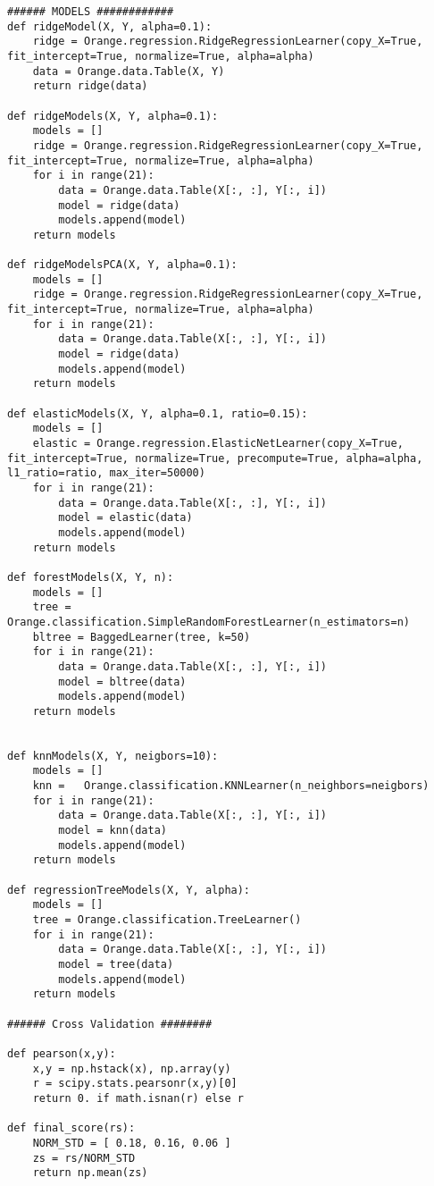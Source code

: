 \documentclass[a4paper,11pt]{article}
\begin{document}
\begin{lstlisting}
###### MODELS ############
def ridgeModel(X, Y, alpha=0.1):
    ridge = Orange.regression.RidgeRegressionLearner(copy_X=True, fit_intercept=True, normalize=True, alpha=alpha)
    data = Orange.data.Table(X, Y)
    return ridge(data)

def ridgeModels(X, Y, alpha=0.1):
    models = []
    ridge = Orange.regression.RidgeRegressionLearner(copy_X=True, fit_intercept=True, normalize=True, alpha=alpha)
    for i in range(21):
        data = Orange.data.Table(X[:, :], Y[:, i])
        model = ridge(data)
        models.append(model)
    return models

def ridgeModelsPCA(X, Y, alpha=0.1):
    models = []
    ridge = Orange.regression.RidgeRegressionLearner(copy_X=True, fit_intercept=True, normalize=True, alpha=alpha)
    for i in range(21):
        data = Orange.data.Table(X[:, :], Y[:, i])
        model = ridge(data)
        models.append(model)
    return models

def elasticModels(X, Y, alpha=0.1, ratio=0.15):
    models = []
    elastic = Orange.regression.ElasticNetLearner(copy_X=True, fit_intercept=True, normalize=True, precompute=True, alpha=alpha, l1_ratio=ratio, max_iter=50000)
    for i in range(21):
        data = Orange.data.Table(X[:, :], Y[:, i])
        model = elastic(data)
        models.append(model)
    return models

def forestModels(X, Y, n):
    models = []
    tree = Orange.classification.SimpleRandomForestLearner(n_estimators=n)
    bltree = BaggedLearner(tree, k=50)
    for i in range(21):
        data = Orange.data.Table(X[:, :], Y[:, i])
        model = bltree(data)
        models.append(model)
    return models


def knnModels(X, Y, neigbors=10):
    models = []
    knn =   Orange.classification.KNNLearner(n_neighbors=neigbors)
    for i in range(21):
        data = Orange.data.Table(X[:, :], Y[:, i])
        model = knn(data)
        models.append(model)
    return models

def regressionTreeModels(X, Y, alpha):
    models = []
    tree = Orange.classification.TreeLearner()
    for i in range(21):
        data = Orange.data.Table(X[:, :], Y[:, i])
        model = tree(data)
        models.append(model)
    return models

###### Cross Validation ########

def pearson(x,y):
    x,y = np.hstack(x), np.array(y)
    r = scipy.stats.pearsonr(x,y)[0]
    return 0. if math.isnan(r) else r

def final_score(rs):
    NORM_STD = [ 0.18, 0.16, 0.06 ]
    zs = rs/NORM_STD
    return np.mean(zs)


\end{lstlisting}
\end{document}
